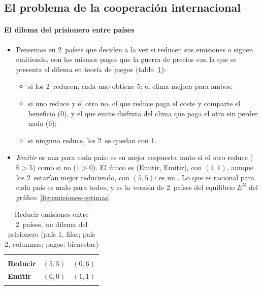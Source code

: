 \documentclass[11pt]{article}
\begin{document}
\subsection{El problema de la cooperación internacional}\label{sec:cooperacion}

\paragraph{El dilema del prisionero entre países}

\begin{itemize}
\item Pensemos en 2~países que deciden a la vez si reducen sus emisiones o siguen emitiendo, con los mismos pagos que la guerra de precios con la que se presenta el dilema en teoría de juegos  (tabla~\ref{tab:dilema-clima}):
  \begin{itemize}
  \item si los 2~reducen, cada uno obtiene 5: el clima mejora para ambos;
  \item si uno reduce y el otro no, el que reduce paga el coste y comparte el beneficio (0), y el que emite disfruta del clima que paga el otro sin perder nada (6);
  \item si ninguno reduce, los 2~se quedan con 1.
  \end{itemize}
\item \emph{Emitir} es una  para cada país: es su mejor respuesta tanto si el otro reduce ($6>5$) como si no ($1>0$). El único  es (Emitir, Emitir), con $(1,1)$, aunque los 2~estarían mejor reduciendo, con $(5,5)$: es un . Lo que es racional para cada país es malo para todos, y es la versión de 2~países del equilibrio $E^{\mathrm{N}}$ del gráfico~\ref{fig:emisiones-optimas}.
\end{itemize}

\begin{table}[H]
\centering
\caption{Reducir emisiones entre 2~países, un dilema del prisionero (país 1, filas; país 2, columnas; pagos: bienestar)}\label{tab:dilema-clima}
\begin{tabular}{>{\centering\arraybackslash}m{2.4cm}|>{\centering\arraybackslash}m{2.6cm}|>{\centering\arraybackslash}m{2.6cm}|}
\multicolumn{1}{c}{} & \multicolumn{1}{c}{\textbf{Reducir}} & \multicolumn{1}{c}{\textbf{Emitir}}\\
\hhline{~|-|-|}
\textbf{Reducir} & $(5,5)$ & $(0,\underline{6})$\\
\hhline{~|-|-|}
\textbf{Emitir} & $(\underline{6},0)$ & \cellcolor{tceesalvia}$(\underline{1},\underline{1})$\\
\hhline{~|-|-|}
\end{tabular}
\end{table}
\end{document}
